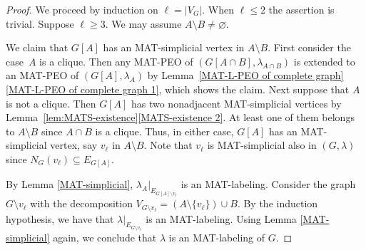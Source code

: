 \documentclass[ALCO, Unicode,published]{cedram}
\begin{document}
\begin{proof}
We proceed by induction on $ \ell = |V_{G}| $.
When $ \ell \leq 2 $ the assertion is trivial. 
Suppose $ \ell \geq 3 $. 
We may assume $ A \setminus  B \neq \varnothing $. 

We claim that $ G[A] $ has an MAT-simplicial vertex in $ A \setminus B $. 
First consider the case~$ A $ is a clique. 
Then any MAT-PEO of $ (G[A\cap B], \lambda_{A\cap B}) $ is extended to an MAT-PEO of $ (G[A], \lambda_{A}) $ by Lemma~\ref{MAT-L-PEO of complete graph}\ref{MAT-L-PEO of complete graph 1}, which shows the claim. 
Next suppose that $ A $ is not a clique. 
Then $ G[A] $ has two nonadjacent MAT-simplicial vertices by Lemma~\ref{lem:MATS-existence}\ref{MATS-existence 2}. 
At least one of them belongs to $ A \setminus B $ since $ A \cap B $ is a clique. 
Thus, in either case, $ G[A] $ has an MAT-simplicial vertex, say  $ v_{\ell} $ in $A \setminus B$.
Note that $ v_{\ell} $ is MAT-simplicial also in $ (G, \lambda) $ since $ N_{G}(v_{\ell}) \subseteq E_{G[A]} $. 

By Lemma \ref{MAT-simplicial}, $ \lambda_A|_{E_{G[A]\setminus v_{\ell}}} $ is an MAT-labeling. 
Consider the graph $ G\setminus v_{\ell} $ with the decomposition $ V_{G\setminus v_{\ell}} = (A\setminus \{v_{\ell}\}) \cup B $. 
By the induction hypothesis, we have that $ \lambda|_{E_{G \setminus v_{\ell}}} $ is an MAT-labeling. 
Using Lemma \ref{MAT-simplicial} again, we conclude that $ \lambda $ is an MAT-labeling of $G$. 
\end{proof}
\end{document}
